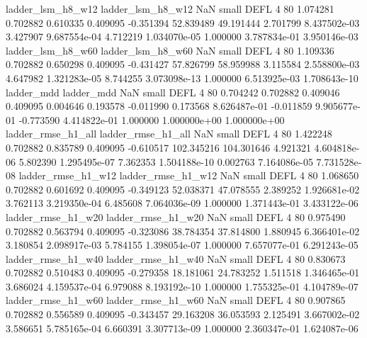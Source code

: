        ladder_lsm_h8_w12        ladder_lsm_h8_w12                   NaN      small     DEFL                 4 80 1.074281       0.702882 0.610335       0.409095   -0.351394     52.839489     49.191444     2.701799   8.437502e-03  3.427907 9.687554e-04     4.712219   1.034070e-05            1.000000    3.787834e-01        3.950146e-03
       ladder_lsm_h8_w60        ladder_lsm_h8_w60                   NaN      small     DEFL                 4 80 1.109336       0.702882 0.650298       0.409095   -0.431427     57.826799     58.959988     3.115584   2.558800e-03  4.647982 1.321283e-05     8.744255   3.073098e-13            1.000000    6.513925e-03        1.708643e-10
              ladder_mdd               ladder_mdd                   NaN      small     DEFL                 4 80 0.704242       0.702882 0.409046       0.409095    0.004646      0.193578     -0.011990     0.173568   8.626487e-01 -0.011859 9.905677e-01    -0.773590   4.414822e-01            1.000000    1.000000e+00        1.000000e+00
      ladder_rmse_h1_all       ladder_rmse_h1_all                   NaN      small     DEFL                 4 80 1.422248       0.702882 0.835789       0.409095   -0.610517    102.345216    104.301646     4.921321   4.604818e-06  5.802390 1.295495e-07     7.362353   1.504188e-10            0.002763    7.164086e-05        7.731528e-08
      ladder_rmse_h1_w12       ladder_rmse_h1_w12                   NaN      small     DEFL                 4 80 1.068650       0.702882 0.601692       0.409095   -0.349123     52.038371     47.078555     2.389252   1.926681e-02  3.762113 3.219350e-04     6.485608   7.064036e-09            1.000000    1.371443e-01        3.433122e-06
      ladder_rmse_h1_w20       ladder_rmse_h1_w20                   NaN      small     DEFL                 4 80 0.975490       0.702882 0.563794       0.409095   -0.323086     38.784354     37.814800     1.880945   6.366401e-02  3.180854 2.098917e-03     5.784155   1.398054e-07            1.000000    7.657077e-01        6.291243e-05
      ladder_rmse_h1_w40       ladder_rmse_h1_w40                   NaN      small     DEFL                 4 80 0.830673       0.702882 0.510483       0.409095   -0.279358     18.181061     24.783252     1.511518   1.346465e-01  3.686024 4.159537e-04     6.979088   8.193192e-10            1.000000    1.755325e-01        4.104789e-07
      ladder_rmse_h1_w60       ladder_rmse_h1_w60                   NaN      small     DEFL                 4 80 0.907865       0.702882 0.556589       0.409095   -0.343457     29.163208     36.053593     2.125491   3.667002e-02  3.586651 5.785165e-04     6.660391   3.307713e-09            1.000000    2.360347e-01        1.624087e-06
